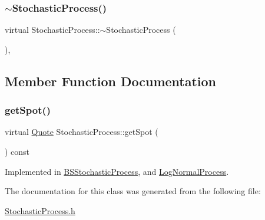\subsubsection{\texorpdfstring{$\sim$\+Stochastic\+Process()}{~StochasticProcess()}}
{\footnotesize\ttfamily virtual Stochastic\+Process\+::$\sim$\+Stochastic\+Process (\begin{DoxyParamCaption}{ }\end{DoxyParamCaption})\hspace{0.3cm}{\ttfamily [inline]}, {\ttfamily [virtual]}}



\subsection{Member Function Documentation}
\hypertarget{class_stochastic_process_aad2ef51ca4bc2fe5f33a73e8f0ee361e}{}\label{class_stochastic_process_aad2ef51ca4bc2fe5f33a73e8f0ee361e} 
\subsubsection{\texorpdfstring{get\+Spot()}{getSpot()}}
{\footnotesize\ttfamily virtual \hyperlink{_name_def_8h_a642a6c5fd87319d922637de0e0bb0305}{Quote} Stochastic\+Process\+::get\+Spot (\begin{DoxyParamCaption}{ }\end{DoxyParamCaption}) const\hspace{0.3cm}{\ttfamily [pure virtual]}}



Implemented in \hyperlink{class_b_s_stochastic_process_a604f867d372fc55a6dfae456f56604ea}{B\+S\+Stochastic\+Process}, and \hyperlink{class_log_normal_process_a3732c44145aa35d1e2000cc0140bfb03}{Log\+Normal\+Process}.



The documentation for this class was generated from the following file\+:\begin{DoxyCompactItemize}
\item 
\hyperlink{_stochastic_process_8h}{Stochastic\+Process.\+h}\end{DoxyCompactItemize}
